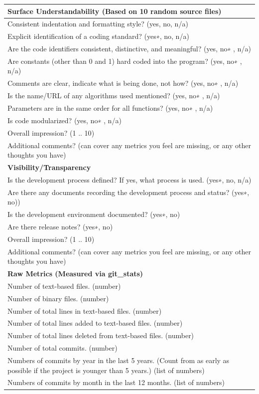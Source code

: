 \documentclass[12pt, notitlepage]{article}
\begin{document}
\begin{singlespace}
\def\arraystretch{1.4}
\begin{tabular}{p{16cm}}
	\hline		
	\textbf{Surface Understandability (Based on 10 random source files)}\\
	\hline
	Consistent indentation and formatting style? ({yes, no, n/a})\\
	Explicit identification of a coding standard? ({yes∗, no, n/a})\\
	Are the code identifiers consistent, distinctive, and meaningful? ({yes, no∗ , n/a})\\
	Are constants (other than 0 and 1) hard coded into the program? ({yes, no∗ , n/a})\\
	Comments are clear, indicate what is being done, not how? ({yes, no∗ , n/a})\\
	Is the name/URL of any algorithms used mentioned? ({yes, no∗ , n/a})\\
	Parameters are in the same order for all functions? ({yes, no∗ , n/a})\\
	Is code modularized? ({yes, no∗ , n/a})\\
	Overall impression? ({1 .. 10})\\
	Additional comments? (can cover any metrics you feel are missing, or any other thoughts you have)\\
	\hline		
	\textbf{Visibility/Transparency}\\
	\hline
	Is the development process defined? If yes, what process is used. ({yes∗, no, n/a})\\
	Are there any documents recording the development process and status?  ({yes∗, no}))\\
	Is the development environment documented? ({yes∗, no})\\
	Are there release notes? ({yes∗, no})\\
	Overall impression? ({1 .. 10})\\
	Additional comments? (can cover any metrics you feel are missing, or any other thoughts you have)\\
	\hline		
	\textbf{Raw Metrics (Measured via git\_stats)}\\
	\hline
	Number of text-based files. (number)\\
	Number of binary files. (number)\\
	Number of total lines in text-based files. (number)\\
	Number of total lines added to text-based files. (number)\\
	Number of total lines deleted from text-based files. (number)\\
	Number of total commits. (number)\\
	Numbers of commits by year in the last 5 years. (Count from as early as possible if the project is younger than 5 years.) (list of numbers)\\
	Numbers of commits by month in the last 12 months. (list of numbers)\\
	\hline
\end{tabular}


\end{singlespace}
\end{document}
